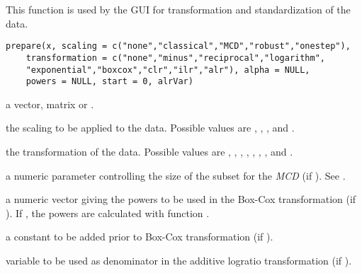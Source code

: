 %
\begin{Description}\relax
This function is used by the  GUI for transformation and 
standardization of the data.
\end{Description}
%
\begin{Usage}
\begin{verbatim}
prepare(x, scaling = c("none","classical","MCD","robust","onestep"),
    transformation = c("none","minus","reciprocal","logarithm",
    "exponential","boxcox","clr","ilr","alr"), alpha = NULL,
    powers = NULL, start = 0, alrVar)
\end{verbatim}
\end{Usage}
%
\begin{Arguments}
\begin{ldescription}
\item[\code{x}] a vector, matrix or .
\item[\code{scaling}] the scaling to be applied to the data.  Possible values 
are , , ,  and 
.
\item[\code{transformation}] the transformation of the data.  Possible values are 
, , , , 
, , ,  and 
.
\item[\code{alpha}] a numeric parameter controlling the size of the 
subset for the \emph{MCD} (if ). See 
.
\item[\code{powers}] a numeric vector giving the powers to be used in the Box-Cox 
transformation (if ).  If , the 
powers are calculated with function .
\item[\code{start}] a constant to be added prior to Box-Cox  transformation 
(if ).
\item[\code{alrVar}] variable to be used as denominator in the additive
logratio transformation (if ).
\end{ldescription}
\end{Arguments}
%
